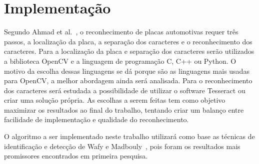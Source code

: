 \section{Implementação}
\label{sec:implementacao}

Segundo Ahmad et al.~\cite{ahmad2015automatic}, o reconhecimento de placas
automotivas requer três passos, a localização da placa, a separação dos
caracteres e o reconhecimento dos caracteres. Para a localização da placa e
separação dos caracteres serão utilizados a biblioteca OpenCV e a linguagem de
programação C, C++ ou Python. O motivo da escolha dessas linguagens se dá porque
são as linguagens mais usadas para OpenCV, a melhor abordagem ainda será
analisada. Para o reconhecimento dos caracteres será estudada a possibilidade de
utilizar o software Tesseract ou criar uma solução própria. As escolhas a serem
feitas tem como objetivo maximizar os resultados ao final do trabalho, tentando
criar um balanço entre facilidade de implementação e qualidade do
reconhecimento.

O algoritmo a ser implementado neste trabalho utilizará como base as técnicas de
identificação e detecção de Wafy e Madbouly~\cite{wafy2016efficient}, pois foram
os resultados mais promissores encontrados em primeira pesquisa.


